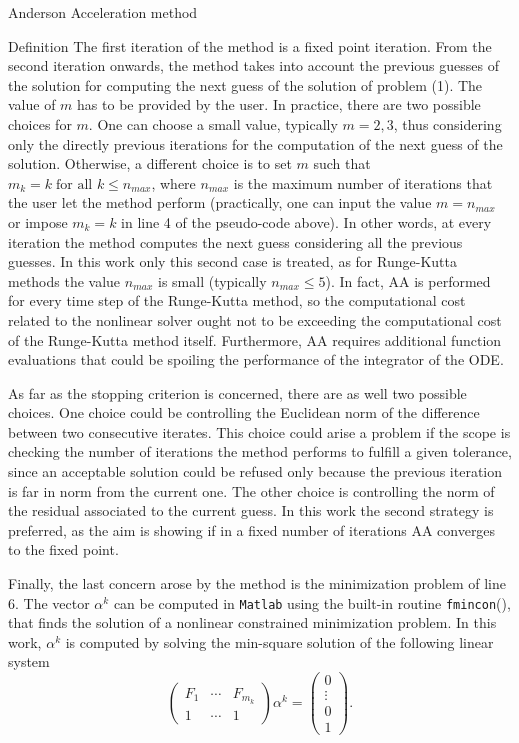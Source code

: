 \documentclass{article}
\begin{document}
\begin{section}{Anderson Acceleration method}
\begin{subsection}{Definition}
The first iteration of the method is a fixed point iteration. From the second iteration onwards, the method takes into account the previous guesses of the solution for computing the next guess of the solution of problem (1). The value of $m$ has to be provided by the user. In practice, there are two possible choices for $m$. One can choose a small value, typically $m=2,3$, thus considering only the directly previous iterations for the computation of the next guess of the solution. Otherwise, a different choice is to set $m$ such that $m_k = k \; \mbox{for all } k \leq n_{max}$, where $n_{max}$ is the maximum number of iterations that the user let the method perform (practically, one can input the value $m = n_{max}$ or impose $m_k = k$ in line 4 of the pseudo-code above). In other words, at every iteration the method computes the next guess considering all the previous guesses. In this work only this second case is treated, as for Runge-Kutta methods the value $n_{max}$ is small (typically $n_{max} \leq 5$). In fact, AA is performed for every time step of the Runge-Kutta method, so the computational cost related to the nonlinear solver ought not to be exceeding the computational cost of the Runge-Kutta method itself. Furthermore, AA requires additional function evaluations that could be spoiling the performance of the integrator of the ODE. \par
As far as the stopping criterion is concerned, there are as well two possible choices. One choice could be controlling the Euclidean norm of the difference between two consecutive iterates. This choice could arise a problem if the scope is checking the number of iterations the method performs to fulfill a given tolerance, since an acceptable solution could be refused only because the previous iteration is far in norm from the current one. The other choice is controlling the norm of the residual associated to the current guess. In this work the second strategy is preferred, as the aim is showing if in a fixed number of iterations AA converges to the fixed point. \par
Finally, the last concern arose by the method is the minimization problem of line 6. The vector  $\alpha^k$ can be computed in \texttt{Matlab} using the built-in routine \texttt{fmincon}(), that finds the solution of a nonlinear constrained minimization problem. In this work, $\alpha^k$ is computed by solving the min-square solution of the following linear system
\begin{equation*}
	\begin{pmatrix}F_1 & \cdots & F_{m_k} \\ 1 & \cdots & 1 \end{pmatrix}\alpha^k = \begin{pmatrix} 0 \\ \vdots \\ 0 \\ 1 \end{pmatrix}.

\end{equation*}
\end{subsection}
\end{section}
\end{document}
